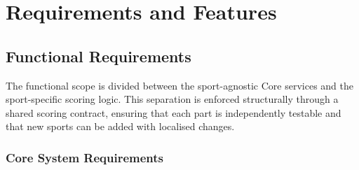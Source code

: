 \documentclass{configurations/polimi3i_thesis}
\renewcommand{\_}{\textunderscore\allowbreak}
\begin{document}
\chapter{Requirements and Features}
\label{ch:requirements_features}

\section{Functional Requirements}
\label{sec:functional_requirements}

The functional scope is divided between the sport-agnostic Core services and the sport-specific scoring logic. This separation is enforced structurally through a shared scoring contract, ensuring that each part is independently testable and that new sports can be added with localised changes.

\subsection{Core System Requirements}
\end{document}
